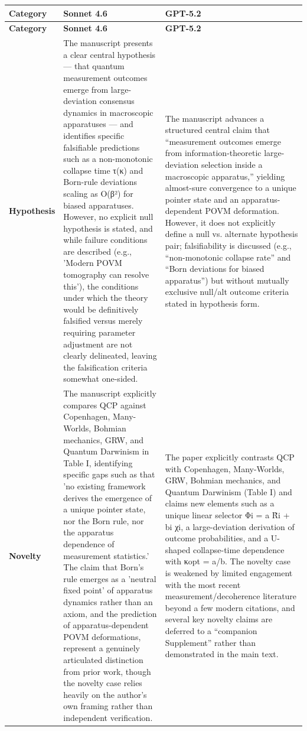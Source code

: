 \documentclass[11pt]{article}
\begin{document}
\begin{longtable}{@{} p{2.2cm} p{6.3cm} p{6.3cm} @{}}
\toprule
\textbf{Category} & \textbf{Sonnet 4.6} & \textbf{GPT-5.2} \\
\midrule
\endfirsthead
\toprule
\textbf{Category} & \textbf{Sonnet 4.6} & \textbf{GPT-5.2} \\
\midrule
\endhead
\bottomrule
\endlastfoot

\rowcolor{rowgray}
\textbf{Hypothesis} &
The manuscript presents a clear central hypothesis — that quantum measurement outcomes emerge from large-deviation consensus dynamics in macroscopic apparatuses — and identifies specific falsifiable predictions such as a non-monotonic collapse time τ(κ) and Born-rule deviations scaling as O(β²) for biased apparatuses. However, no explicit null hypothesis is stated, and while failure conditions are described (e.g., 'Modern POVM tomography can resolve this'), the conditions under which the theory would be definitively falsified versus merely requiring parameter adjustment are not clearly delineated, leaving the falsification criteria somewhat one-sided. &
The manuscript advances a structured central claim that “measurement outcomes emerge from information-theoretic large-deviation selection inside a macroscopic apparatus,” yielding almost-sure convergence to a unique pointer state and an apparatus-dependent POVM deformation. However, it does not explicitly define a null vs. alternate hypothesis pair; falsifiability is discussed (e.g., “non-monotonic collapse rate” and “Born deviations for biased apparatus”) but without mutually exclusive null/alt outcome criteria stated in hypothesis form. \\[6pt]

\textbf{Novelty} &
The manuscript explicitly compares QCP against Copenhagen, Many-Worlds, Bohmian mechanics, GRW, and Quantum Darwinism in Table I, identifying specific gaps such as that 'no existing framework derives the emergence of a unique pointer state, nor the Born rule, nor the apparatus dependence of measurement statistics.' The claim that Born's rule emerges as a 'neutral fixed point' of apparatus dynamics rather than an axiom, and the prediction of apparatus-dependent POVM deformations, represent a genuinely articulated distinction from prior work, though the novelty case relies heavily on the author's own framing rather than independent verification. &
The paper explicitly contrasts QCP with Copenhagen, Many-Worlds, GRW, Bohmian mechanics, and Quantum Darwinism (Table I) and claims new elements such as a unique linear selector Φi = a R̃i + bi χi, a large-deviation derivation of outcome probabilities, and a U-shaped collapse-time dependence with κopt = a/b. The novelty case is weakened by limited engagement with the most recent measurement/decoherence literature beyond a few modern citations, and several key novelty claims are deferred to a “companion Supplement” rather than demonstrated in the main text. \\[6pt]


\end{longtable}
\end{document}
